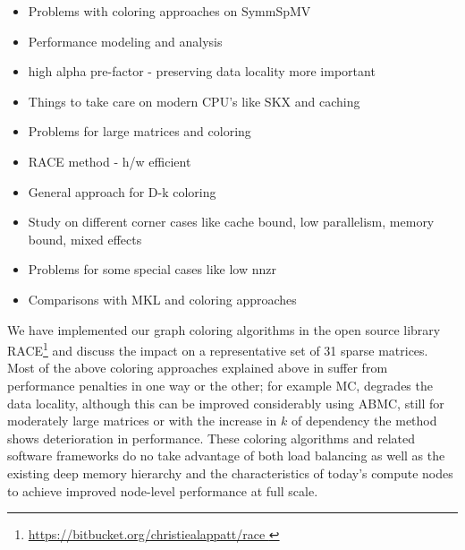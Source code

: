 
\begin{itemize}
	\item Problems with coloring approaches on SymmSpMV
	\item Performance modeling and analysis
	\item high alpha pre-factor - preserving data locality more important
	\item Things to take care on modern CPU's like SKX and caching
	\item Problems for large matrices and coloring
	\item RACE method - h/w efficient 
	\item General approach for D-k coloring
	\item Study on different corner cases like cache bound, low parallelism, memory bound, mixed effects 
	\item Problems for some special cases like low nnzr
	\item Comparisons with MKL and coloring approaches
\end{itemize}
We have implemented our graph coloring algorithms in the open source library \acrfull{RACE}\footnote{\href{https://bitbucket.org/christiealappatt/race}{https://bitbucket.org/christiealappatt/race }} and discuss the impact on a representative set of 31 sparse matrices. Most of the above coloring approaches explained above in  suffer from performance penalties in one way or the other; for example \acrshort{MC}, degrades the data locality, although this can be improved considerably using \acrshort{ABMC}, still for moderately large matrices or with the increase in $k$ of \DK dependency the method shows deterioration in performance. 
These coloring algorithms and related software frameworks do no take advantage of both load balancing as well as the existing deep memory hierarchy and the characteristics of today's compute nodes to achieve improved node-level performance at full scale.

